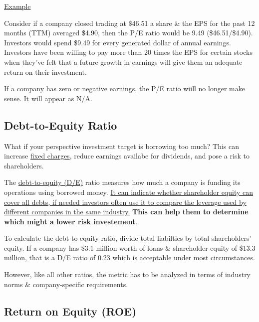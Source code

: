 \documentclass{article}
\begin{document}
	\underline{Example} \newline

	Consider if a company closed trading at \$46.51 a share \& the EPS for the past 12 months (TTM) averaged \$4.90, then the P/E ratio would be 9.49 (\$46.51/\$4.90). Investors would spend \$9.49 for
	every generated dollar of annual earnings. Investors have been willing to pay more than 20 times the EPS for certain stocks when they've felt that a future growth in earnings will give them an
	adequate return on their investment. \newline

	If a company has zero or negative earnings, the P/E ratio wiill no longer make sense. It will appear as N/A.

	\subsection{Debt-to-Equity Ratio}

	What if your perspective investment target is borrowing too much? This can increase \href{https://www.investopedia.com/terms/f/fixed-charge.asp}{fixed charges}, reduce earnings availabe for
	dividends, and pose a risk to shareholders. \newline

	The \href{https://www.investopedia.com/terms/d/debtequityratio.asp}{debt-to-equity (D/E)} ratio measures how much a company is funding its operations using borrowed money. \underline{It can 
	indicate whether shareholder equity can cover all debts, if needed investors often use it to compare the leverage used by different companies in the same industry.} \newline
	{\bf This can help them to determine which might a lower risk investement}. \newline \newline

	To calculate the debt-to-equity ratio, divide total liabilties by total shareholders' equity. If a company has \$3.1 million worth of loans \& shareholder equity of \$13.3 million, that is a 
	D/E ratio of 0.23 which is acceptable under most circumstances. \newline \newline


	However, like all other ratios, the metric has to be analyzed in terms of industry norms \& company-specific requirements.

	\subsection{Return on Equity (ROE)}
\end{document}
